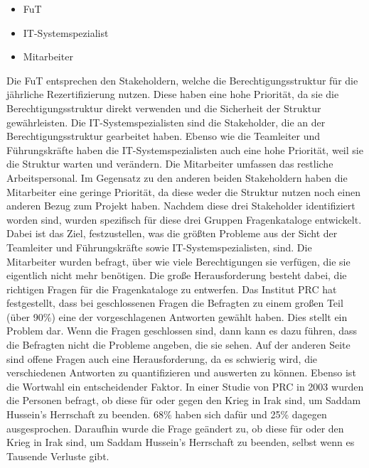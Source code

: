\begin{itemize}
	\item \ac{FuT}
	\item IT-Systemspezialist
	\item Mitarbeiter
\end{itemize}
Die \ac{FuT} entsprechen den Stakeholdern, welche die Berechtigungsstruktur für die jährliche Rezertifizierung nutzen.
Diese haben eine hohe Priorität, da sie die Berechtigungsstruktur direkt verwenden und die Sicherheit der Struktur gewährleisten.
\newline
Die IT-Systemspezialisten sind die Stakeholder, die an der Berechtigungsstruktur gearbeitet haben.
Ebenso wie die Teamleiter und Führungskräfte haben die IT-Systemspezialisten auch eine hohe Priorität, weil sie die Struktur warten und verändern.
\newline
Die Mitarbeiter umfassen das restliche Arbeitspersonal.
Im Gegensatz zu den anderen beiden Stakeholdern haben die Mitarbeiter eine geringe Priorität, da diese weder die Struktur nutzen noch einen anderen Bezug zum Projekt haben.
\newline
\newline
Nachdem diese drei Stakeholder identifiziert worden sind, wurden spezifisch für diese drei Gruppen Fragenkataloge entwickelt.
Dabei ist das Ziel, festzustellen, was die größten Probleme aus der Sicht der Teamleiter und Führungskräfte sowie IT-Systemspezialisten, sind.
Die Mitarbeiter wurden befragt, über wie viele Berechtigungen sie verfügen, die sie eigentlich nicht mehr benötigen.
Die große Herausforderung besteht dabei, die richtigen Fragen für die Fragenkataloge zu entwerfen.
Das Institut \ac{PRC} hat festgestellt, dass bei geschlossenen Fragen die Befragten zu einem großen Teil (über 90\%) eine der vorgeschlagenen Antworten gewählt haben. \cite{Survey}
Dies stellt ein Problem dar.
Wenn die Fragen geschlossen sind, dann kann es dazu führen, dass die Befragten nicht die Probleme angeben, die sie sehen.
Auf der anderen Seite sind offene Fragen auch eine Herausforderung, da es schwierig wird, die verschiedenen Antworten zu quantifizieren und auswerten zu können.
Ebenso ist die Wortwahl ein entscheidender Faktor.
In einer Studie von \ac{PRC} in 2003 wurden die Personen befragt, ob diese für oder gegen den Krieg in Irak sind, um Saddam Hussein's Herrschaft zu beenden.
68\% haben sich dafür und 25\% dagegen ausgesprochen.
Daraufhin wurde die Frage geändert zu, ob diese für oder den Krieg in Irak sind, um Saddam Hussein's Herrschaft zu beenden, selbst wenn es Tausende Verluste gibt.
